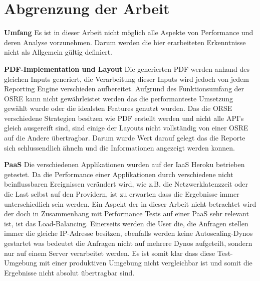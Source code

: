 \documentclass[main.tex]{subfiles}
\begin{document}
\section{ Abgrenzung der Arbeit}

\textbf{Umfang}\newline
Es ist in dieser Arbeit nicht möglich alle Aspekte von Performance und deren Analyse vorzunehmen. Darum werden die hier erarbeiteten Erkenntnisse nicht als Allgemein gültig definiert. 

\textbf{PDF-Implementation und Layout} \newline
Die generierten PDF werden anhand des gleichen Inputs generiert, die Verarbeitung dieser Inputs wird jedoch von jedem Reporting Engine verschieden aufbereitet. Aufgrund des Funktionsumfang der OSRE kann nicht gewährleistet werden das die performanteste Umsetzung gewählt wurde oder die idealsten Features genutzt wurden. Das die ORSE verschiedene Strategien besitzen wie PDF erstellt werden und nicht alle API's gleich ausgereift sind, sind einige der Layouts nicht vollständig von einer OSRE auf die Andere übertragbar. Darum wurde Wert darauf gelegt das die Reporte sich schlussendlich ähneln und die Informationen angezeigt werden konnen. 

\textbf{PaaS}\newline
Die verschiedenen Applikationen wurden auf der IaaS Heroku betrieben getestet. Da die Performance einer Applikationen durch verschiedene nicht beinflussbaren Ereignissen verändert wird, wie z.B. die Netzwerklatenzzeit oder die Last selbst auf den Providern, ist zu erwarten dass die Ergebnisse immer unterschiedlich sein werden. 
Ein Aspekt der in dieser Arbeit nicht betrachtet wird der doch in Zusammenhang mit Performance Tests auf einer PaaS sehr relevant ist, ist das Load-Balancing. Einerseits werden die User die, die Anfragen stellen immer die gleiche IP-Adresse besitzen, ebenfalls werden keine Autoscaling-Dynos gestartet was bedeutet die Anfragen nicht auf mehrere Dynos aufgeteilt, sondern nur auf einem Server verarbeitet werden. Es ist somit klar dass diese Test-Umgebung mit einer produktiven Umgebung nicht vergleichbar ist und somit die Ergebnisse nicht absolut übertragbar sind.
\end{document}
